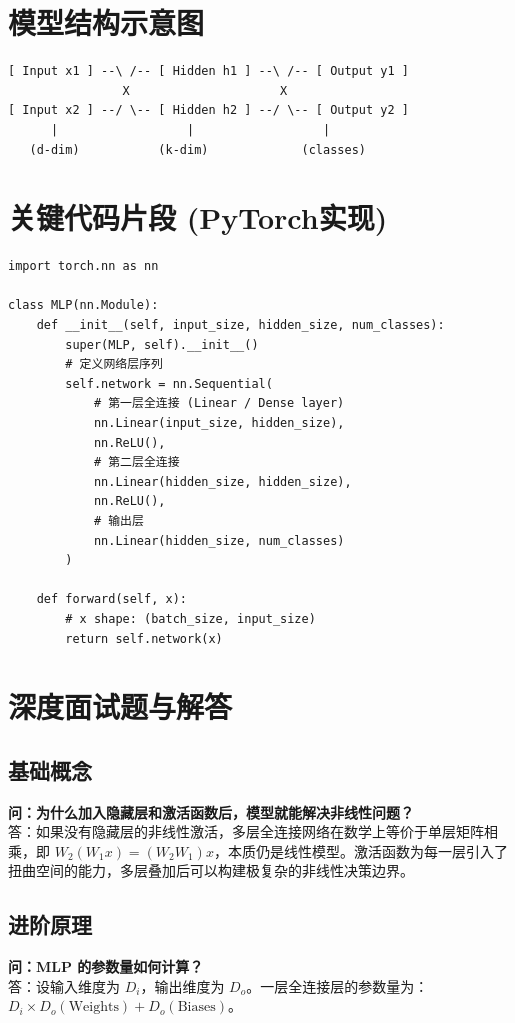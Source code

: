 \documentclass[12pt, a4paper]{article}
\begin{document}
\section{模型结构示意图}
\begin{verbatim}
[ Input x1 ] --\ /-- [ Hidden h1 ] --\ /-- [ Output y1 ]
                X                     X
[ Input x2 ] --/ \-- [ Hidden h2 ] --/ \-- [ Output y2 ]
      |                  |                  |
   (d-dim)           (k-dim)             (classes)
\end{verbatim}

\section{关键代码片段 (PyTorch实现)}
\begin{lstlisting}
import torch.nn as nn

class MLP(nn.Module):
    def __init__(self, input_size, hidden_size, num_classes):
        super(MLP, self).__init__()
        # 定义网络层序列
        self.network = nn.Sequential(
            # 第一层全连接 (Linear / Dense layer)
            nn.Linear(input_size, hidden_size),
            nn.ReLU(),
            # 第二层全连接
            nn.Linear(hidden_size, hidden_size),
            nn.ReLU(),
            # 输出层
            nn.Linear(hidden_size, num_classes)
        )

    def forward(self, x):
        # x shape: (batch_size, input_size)
        return self.network(x)
\end{lstlisting}

\section{深度面试题与解答}
\subsection{基础概念}
\textbf{问：为什么加入隐藏层和激活函数后，模型就能解决非线性问题？}\\
答：如果没有隐藏层的非线性激活，多层全连接网络在数学上等价于单层矩阵相乘，即 $W_2(W_1 x) = (W_2 W_1)x$，本质仍是线性模型。激活函数为每一层引入了扭曲空间的能力，多层叠加后可以构建极复杂的非线性决策边界。

\subsection{进阶原理}
\textbf{问：MLP 的参数量如何计算？}\\
答：设输入维度为 $D_i$，输出维度为 $D_o$。一层全连接层的参数量为：$D_i \times D_o (\text{Weights}) + D_o (\text{Biases})$。
\end{document}
